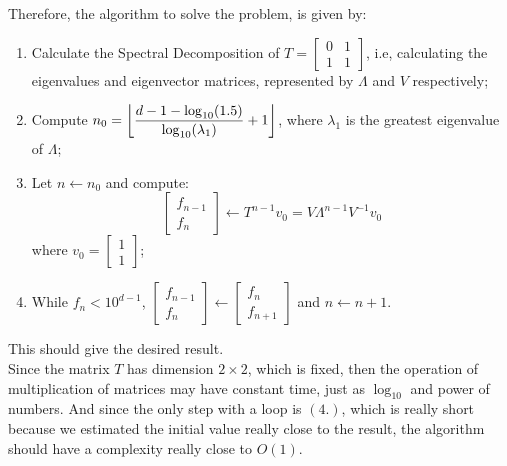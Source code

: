 \documentclass{article}
\DeclarePairedDelimiter\floor{\lfloor}{\rfloor}
\begin{document}
Therefore, the algorithm to solve the problem, is given by:
\begin{enumerate}
    \item Calculate the Spectral Decomposition of $T = \begin{bmatrix}
        0 & 1\\
        1 & 1
    \end{bmatrix}$, i.e, calculating the eigenvalues and eigenvector matrices,
    represented by $\Lambda$ and $V$ respectively;
    \item Compute $n_0 = \floor*{\dfrac{d  - 1- \log_{10}(1.5)}{\log_{10}(\lambda_1)} + 1}$,
    where  $\lambda_1$ is the greatest eigenvalue of $\Lambda$;
    \item Let $n \leftarrow n_0$ and compute:
    \begin{equation*}
        \begin{bmatrix}
            f_{n-1}\\
            f_n
        \end{bmatrix} \leftarrow T^{n-1}v_0 = V \Lambda^{n-1} V^{-1} v_0
    \end{equation*} where $v_0 = \begin{bmatrix}
        1 \\
        1
    \end{bmatrix}$;
    \item While $f_n < 10^{d - 1}$, $\begin{bmatrix}
        f_{n-1}\\
        f_{n}
    \end{bmatrix} \leftarrow \begin{bmatrix}
        f_n\\
        f_{n+1}
    \end{bmatrix}$ and $n \leftarrow n + 1$.
\end{enumerate}
\vspace{1cm}

This should give the desired result.\\

Since the matrix $T$ has dimension $2 \times 2$, which is fixed, then
the operation of multiplication of matrices may have constant time, just as
$\log_{10}$ and power of numbers. And since the only step with a loop is
$(4.)$, which is really short because we estimated the initial value really
close to the result, the algorithm should have a complexity really close to $O(1)$.
\end{document}
